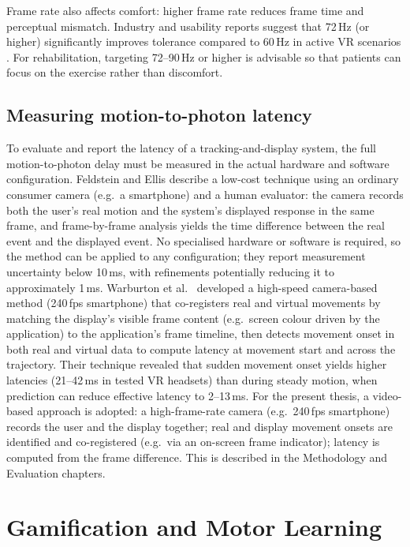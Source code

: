 Frame rate also affects comfort: higher frame rate reduces frame time and perceptual mismatch. Industry and usability reports suggest that 72\,Hz (or higher) significantly improves tolerance compared to 60\,Hz in active VR scenarios \cite{battlestart2024fps}. For rehabilitation, targeting 72--90\,Hz or higher is advisable so that patients can focus on the exercise rather than discomfort.

\subsection{Measuring motion-to-photon latency}

To evaluate and report the latency of a tracking-and-display system, the full motion-to-photon delay must be measured in the actual hardware and software configuration. Feldstein and Ellis \cite{feldstein2021video} describe a low-cost technique using an ordinary consumer camera (e.g.\ a smartphone) and a human evaluator: the camera records both the user's real motion and the system's displayed response in the same frame, and frame-by-frame analysis yields the time difference between the real event and the displayed event. No specialised hardware or software is required, so the method can be applied to any configuration; they report measurement uncertainty below 10\,ms, with refinements potentially reducing it to approximately 1\,ms. Warburton et al.\ \cite{warburton2023motionphoton} developed a high-speed camera-based method (240\,fps smartphone) that co-registers real and virtual movements by matching the display's visible frame content (e.g.\ screen colour driven by the application) to the application's frame timeline, then detects movement onset in both real and virtual data to compute latency at movement start and across the trajectory. Their technique revealed that sudden movement onset yields higher latencies (21--42\,ms in tested VR headsets) than during steady motion, when prediction can reduce effective latency to 2--13\,ms. For the present thesis, a video-based approach is adopted: a high-frame-rate camera (e.g.\ 240\,fps smartphone) records the user and the display together; real and display movement onsets are identified and co-registered (e.g.\ via an on-screen frame indicator); latency is computed from the frame difference. This is described in the Methodology and Evaluation chapters.

\section{Gamification and Motor Learning}

